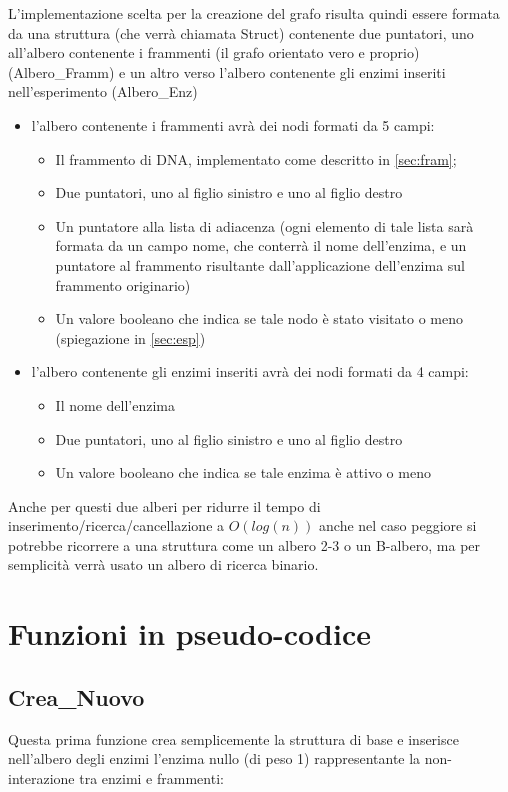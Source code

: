 \documentclass[a4paper,10pt]{article}
\begin{document}
L'implementazione scelta per la creazione del grafo risulta quindi essere formata da una struttura (che verrà chiamata Struct) contenente due puntatori, uno all'albero contenente i frammenti (il grafo orientato vero e proprio)(Albero\_{}Framm) e un altro verso l'albero contenente gli enzimi inseriti nell'esperimento (Albero\_{}Enz)
\begin{itemize}
\item l'albero contenente i frammenti avrà dei nodi formati da 5 campi: 
\begin{itemize}
\item Il frammento di DNA, implementato come descritto in \ref{sec:fram};
\item Due puntatori, uno al figlio sinistro e uno al figlio destro
\item Un puntatore alla lista di adiacenza (ogni elemento di tale lista sarà formata da un campo nome, che conterrà il nome dell'enzima, e un puntatore al frammento risultante dall'applicazione dell'enzima sul frammento originario)
\item Un valore booleano che indica se tale nodo è stato visitato o meno (spiegazione in \ref{sec:esp})
\end{itemize}
\item l'albero contenente gli enzimi inseriti avrà dei nodi formati da 4 campi:
\begin{itemize}
\item Il nome dell'enzima
\item Due puntatori, uno al figlio sinistro e uno al figlio destro
\item Un valore booleano che indica se tale enzima è attivo o meno
\end{itemize}
\end{itemize}
Anche per questi due alberi per ridurre il tempo di inserimento/ricerca/cancellazione a $O(log(n))$ anche nel caso peggiore si potrebbe ricorrere a una struttura come un albero 2-3 o un B-albero, ma per semplicità verrà usato un albero di ricerca binario.

\section{Funzioni in pseudo-codice}
\subsection{Crea\_{}Nuovo}
Questa prima funzione crea semplicemente la struttura di base e inserisce nell'albero degli enzimi l'enzima nullo (di peso 1) rappresentante la non-interazione tra enzimi e frammenti:
\end{document}
